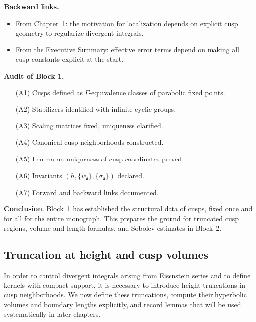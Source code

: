 \medskip
\noindent
\textbf{Backward links.}
\begin{itemize}
  \item From Chapter~1: the motivation for localization depends
        on explicit cusp geometry to regularize divergent integrals.
  \item From the Executive Summary: effective error terms depend on
        making all cusp constants explicit at the start.
\end{itemize}

\medskip
\noindent
\textbf{Audit of Block 1.}
\begin{itemize}
  \item[(A1)] Cusps defined as $\Gamma$-equivalence classes of parabolic fixed points.
  \item[(A2)] Stabilizers identified with infinite cyclic groups.
  \item[(A3)] Scaling matrices fixed, uniqueness clarified.
  \item[(A4)] Canonical cusp neighborhoods constructed.
  \item[(A5)] Lemma on uniqueness of cusp coordinates proved.
  \item[(A6)] Invariants $(h, \{w_{\mathfrak{a}}\}, \{\sigma_{\mathfrak{a}}\})$ declared.
  \item[(A7)] Forward and backward links documented.
\end{itemize}

\medskip
\noindent
\textbf{Conclusion.}
Block~1 has established the structural data of cusps,
fixed once and for all for the entire monograph.
This prepares the ground for truncated cusp regions,
volume and length formulas, and Sobolev estimates in Block~2.


\subsection{Truncation at height and cusp volumes}

In order to control divergent integrals arising from Eisenstein series
and to define kernels with compact support, it is necessary to introduce
height truncations in cusp neighborhoods. 
We now define these truncations, compute their hyperbolic volumes and
boundary lengths explicitly, and record lemmas that will be used
systematically in later chapters.

